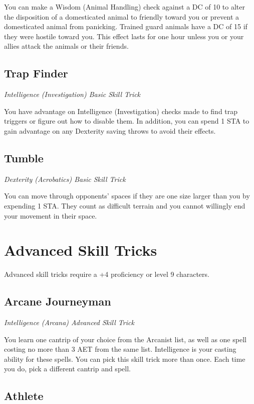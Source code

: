 You can make a Wisdom (Animal Handling) check against a DC of 10 to alter the disposition of a domesticated animal to friendly toward you or prevent a domesticated animal from panicking. Trained guard animals have a DC of 15 if they were hostile toward you. This effect lasts for one hour unless you or your allies attack the animals or their friends.

\subsection{Trap Finder}\label{st:trap-finder}

\textit{Intelligence (Investigation) Basic Skill Trick}

You have advantage on Intelligence (Investigation) checks made to find trap triggers or figure out how to disable them. In addition, you can spend 1 STA to gain advantage on any Dexterity saving throws to avoid their effects.

\subsection{Tumble}\label{st:tumble}

\textit{Dexterity (Acrobatics) Basic Skill Trick}

You can move through opponents' spaces if they are one size larger than you by expending 1 STA. They count as difficult terrain and you cannot willingly end your movement in their space.

\section{Advanced Skill Tricks}
\label{sec:skill-tricks-advanced}

Advanced skill tricks require a +4 proficiency or level 9 characters.

\subsection{Arcane Journeyman}

\textit{Intelligence (Arcana) Advanced Skill Trick}

You learn one cantrip of your choice from the Arcanist list, as well as one spell costing no more than 3 AET from the same list. Intelligence is your casting ability for these spells. You can pick this skill trick more than once. Each time you do, pick a different cantrip and spell.

\subsection{Athlete}

